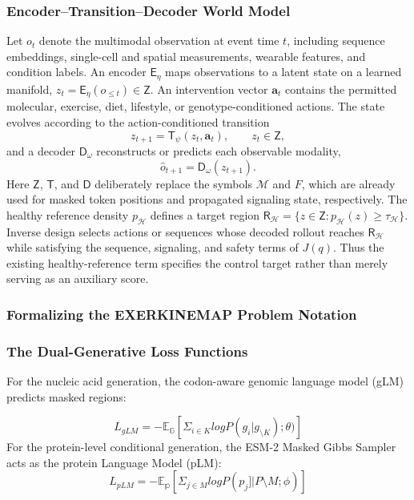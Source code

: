 \documentclass[11pt]{article}
\begin{document}
\subsubsection{Encoder--Transition--Decoder World Model}
Let $o_t$ denote the multimodal observation at event time $t$, including sequence embeddings, single-cell and spatial measurements, wearable features, and condition labels. An encoder $\mathsf{E}_{\eta}$ maps observations to a latent state on a learned manifold, $z_t=\mathsf{E}_{\eta}(o_{\leq t})\in\mathsf{Z}$. An intervention vector $\mathbf{a}_t$ contains the permitted molecular, exercise, diet, lifestyle, or genotype-conditioned actions. The state evolves according to the action-conditioned transition
\begin{equation}
z_{t+1}=\mathsf{T}_{\psi}(z_t,\mathbf{a}_t), \qquad z_t\in\mathsf{Z},
\end{equation}
and a decoder $\mathsf{D}_{\omega}$ reconstructs or predicts each observable modality,
\begin{equation}
\widehat{o}_{t+1}=\mathsf{D}_{\omega}(z_{t+1}).
\end{equation}
Here $\mathsf{Z}$, $\mathsf{T}$, and $\mathsf{D}$ deliberately replace the symbols $\mathcal{M}$ and $F$, which are already used for masked token positions and propagated signaling state, respectively. The healthy reference density $p_{\mathcal{H}}$ defines a target region $\mathsf{R}_{\mathcal{H}}=\{z\in\mathsf{Z}:p_{\mathcal{H}}(z)\geq\tau_{\mathcal{H}}\}$. Inverse design selects actions or sequences whose decoded rollout reaches $\mathsf{R}_{\mathcal{H}}$ while satisfying the sequence, signaling, and safety terms of $J(q)$. Thus the existing healthy-reference term specifies the control target rather than merely serving as an auxiliary score.

\subsubsection{Formalizing the EXERKINEMAP Problem Notation}
\subsubsection{The Dual-Generative Loss Functions}
For the nucleic acid generation, the codon-aware genomic language model (gLM) predicts masked regions: 

\begin{equation}
L_{gLM} = -\mathbb{E_G}[\Sigma_{i\in K}logP(g_i | g_{\setminus K}); \theta)]
\end{equation}
For the protein-level conditional generation, the ESM-2 Masked Gibbs Sampler acts as the protein Language Model (pLM):
\begin{equation}
L_{pLM} = -\mathbb{E_p}[\Sigma_{j\in M}logP(p_j]|P\setminus M;\phi)]
\end{equation}
\end{document}
